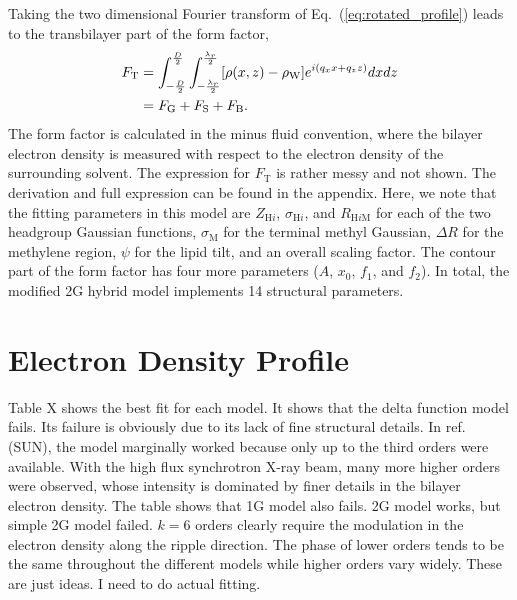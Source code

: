 \documentclass[12pt,letterpaper]{article}
\newcommand{\zh}[1]{Z_{\mathrm{H}#1}}
\newcommand{\sigmah}[1]{\sigma_{\mathrm{H}#1}}
\newcommand{\sigmam}{\sigma_\mathrm{M}}
\newcommand{\rhow}{\rho_\mathrm{W}}
\newcommand{\Rhm}[1]{R_{\mathrm{H}#1\mathrm{M}}}
\begin{document}
Taking the two dimensional Fourier transform of Eq.~(\ref{eq:rotated_profile})
leads to the transbilayer part of the form factor,
\begin{align}
  F_\mathrm{T} 
  &= \int_{-\frac{D}{2}}^{\frac{D}{2}} \int_{-\frac{\lambda_r}{2}}^{\frac{\lambda_r}{2}} 
     \bracks{\rho(x,z)-\rhow} e^{i(q_xx+q_zz)} dxdz \\
  &= F_\mathrm{G} + F_\mathrm{S} + F_\mathrm{B}.
\end{align}
The form factor is calculated in the minus fluid convention, 
where the bilayer electron density
is measured with respect to the electron density of the surrounding solvent.
The expression for $F_\mathrm{T}$ is rather messy and not shown. 
The derivation and full expression can be found in the appendix. Here, 
we note that
the fitting parameters in this model are $\zh{i}$, $\sigmah{i}$, and 
$\Rhm{i}$ for each of the two headgroup Gaussian functions, $\sigmam$ for
the terminal methyl Gaussian, $\Delta R$ for the methylene region, $\psi$ for
the lipid tilt, and an overall scaling factor. The contour part of the 
form factor has four more parameters ($A$, $x_0$, $f_1$, and $f_2$).
In total, the modified 2G hybrid model implements 14 structural parameters.


\section{Electron Density Profile}
Table X shows the best fit for each model. It shows that the delta function
model fails. Its failure is obviously due to its lack of fine structural 
details. In ref. (SUN), the model marginally worked because only up to
the third orders were available. With the high flux synchrotron X-ray beam,
many more higher orders were observed, whose intensity is dominated by
finer details in the bilayer electron density. The table shows that
1G model also fails. 2G model works, but simple 2G model failed. $k=6$ orders
clearly require the modulation in the electron density along the ripple 
direction. The phase of lower orders tends to be the same throughout
the different models while higher orders vary widely. These are just ideas.
I need to do actual fitting.


\appendix %
\end{document}
